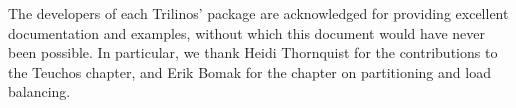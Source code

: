 \documentclass[12pt,relax]{SANDreport}
\begin{document}
\medskip

The developers of each Trilinos' package are acknowledged for providing
excellent documentation and examples, without which this document would
have never been possible. In particular, we thank Heidi Thornquist for
the contributions to the Teuchos chapter, and Erik Bomak for the chapter
on partitioning and load balancing.

\clearpage

\SANDmain

\tableofcontents

\clearpage



%

\clearpage
\newpage


\clearpage
\newpage


\clearpage
\newpage


\clearpage
\newpage


\clearpage
\newpage


\clearpage
\newpage


\clearpage
\newpage


\clearpage
\newpage


\clearpage
\newpage


%

\clearpage
\newpage


\clearpage
\newpage




\end{document}

